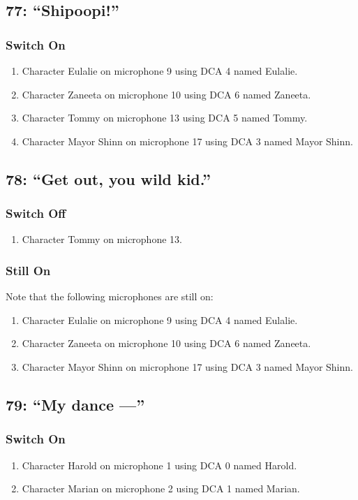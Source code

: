 \subsection* {77: ``Shipoopi!''}
\subsubsection* {Switch On}
\begin{enumerate}
\item Character Eulalie on microphone 9 using DCA 4 named Eulalie.
\item Character Zaneeta on microphone 10 using DCA 6 named Zaneeta.
\item Character Tommy on microphone 13 using DCA 5 named Tommy.
\item Character Mayor Shinn on microphone 17 using DCA 3 named Mayor Shinn.
\end{enumerate}
\subsection* {78: ``Get out, you wild kid.''}
\subsubsection* {Switch Off}
\begin{enumerate}
\item Character Tommy on microphone 13.
\end{enumerate}
\subsubsection* {Still On}
Note that the following microphones are still on:
\begin{enumerate}
\item Character Eulalie on microphone 9 using DCA 4 named Eulalie.
\item Character Zaneeta on microphone 10 using DCA 6 named Zaneeta.
\item Character Mayor Shinn on microphone 17 using DCA 3 named Mayor Shinn.
\end{enumerate}
\subsection* {79: ``My dance ---''}
\subsubsection* {Switch On}
\begin{enumerate}
\item Character Harold on microphone 1 using DCA 0 named Harold.
\item Character Marian on microphone 2 using DCA 1 named Marian.
\end{enumerate}
